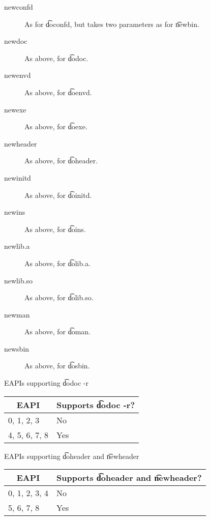 \begin{description}
\item[newconfd] As for \t{doconfd}, but takes two parameters as for \t{newbin}.

\item[newdoc] As above, for \t{dodoc}.

\item[newenvd] As above, for \t{doenvd}.

\item[newexe] As above, for \t{doexe}.

\item[newheader] As above, for \t{doheader}.

\item[newinitd] As above, for \t{doinitd}.

\item[newins] As above, for \t{doins}.

\item[newlib.a] As above, for \t{dolib.a}.

\item[newlib.so] As above, for \t{dolib.so}.

\item[newman] As above, for \t{doman}.

\item[newsbin] As above, for \t{dosbin}.

\end{description}

\begin{centertable}{EAPIs supporting \t{dodoc -r}}
    \label{tab:dodoc-table}
    \begin{tabular}{ll}
      \toprule
      \multicolumn{1}{c}{\textbf{EAPI}} &
      \multicolumn{1}{c}{\textbf{Supports \t{dodoc -r}?}} \\
      \midrule
      0, 1, 2, 3        & No  \\
      4, 5, 6, 7, 8     & Yes \\
      \bottomrule
    \end{tabular}
\end{centertable}

\begin{centertable}{EAPIs supporting \t{doheader} and \t{newheader}}
    \label{tab:doheader-table}
    \begin{tabular}{ll}
      \toprule
      \multicolumn{1}{c}{\textbf{EAPI}} &
      \multicolumn{1}{c}{\textbf{Supports \t{doheader} and \t{newheader}?}} \\
      \midrule
      0, 1, 2, 3, 4     & No  \\
      5, 6, 7, 8        & Yes \\
      \bottomrule
    \end{tabular}
\end{centertable}

